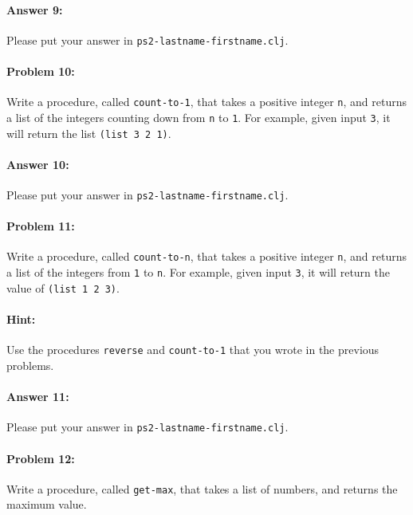 \documentclass[10pt]{article}
\newcommand{\PSnum}{2}
\begin{document}
\paragraph{Answer 9:} Please put your answer in \texttt{ps\PSnum-lastname-firstname.clj}.

\noindent\hrulefill %

\paragraph{Problem 10:}
  Write a procedure, called \texttt{count-to-1}, that takes a positive
  integer \texttt{n}, and returns a list of the integers counting down
  from \texttt{n} to \texttt{1}. For example, given input \texttt{3},
  it will return the list \texttt{(list 3 2 1)}.

\paragraph{Answer 10:} Please put your answer in \texttt{ps\PSnum-lastname-firstname.clj}.

\noindent\hrulefill %

\paragraph{Problem 11:}
  Write a procedure, called \texttt{count-to-n}, that takes a positive
  integer \texttt{n}, and returns a list of the integers from
  \texttt{1} to \texttt{n}. For example, given input \texttt{3}, it
  will return the value of \texttt{(list 1 2 3)}. 
  
\paragraph{Hint:} 
  Use the procedures \texttt{reverse} 
  and \texttt{count-to-1} that you wrote in the previous problems.

\paragraph{Answer 11:} Please put your answer in \texttt{ps\PSnum-lastname-firstname.clj}.

\noindent\hrulefill %

\paragraph{Problem 12:}
  Write a procedure, called \texttt{get-max}, that takes a list of numbers,
  and returns the maximum value.
\end{document}
